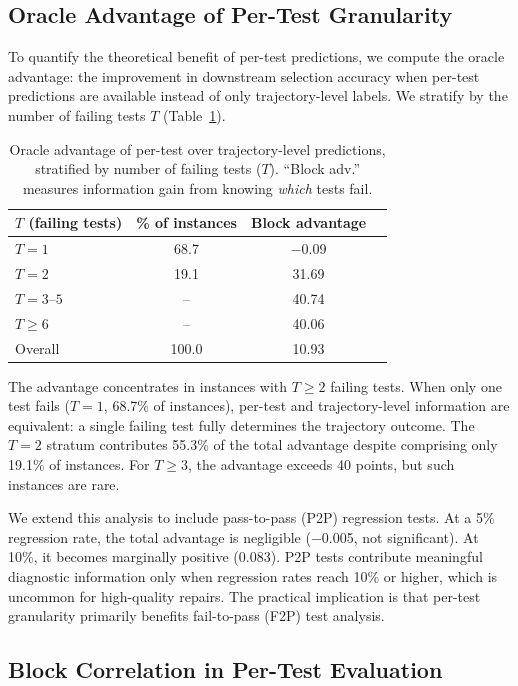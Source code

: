 \documentclass[11pt,a4paper]{article}
\begin{document}
\subsection{Oracle Advantage of Per-Test Granularity}
\label{sec:oracle}

To quantify the theoretical benefit of per-test predictions, we compute the oracle advantage: the improvement in downstream selection accuracy when per-test predictions are available instead of only trajectory-level labels. We stratify by the number of failing tests $T$ (Table~\ref{tab:oracle}).

\begin{table}[t]
\centering
\caption{Oracle advantage of per-test over trajectory-level predictions, stratified by number of failing tests ($T$). ``Block adv.'' measures information gain from knowing \emph{which} tests fail.}
\label{tab:oracle}
\small
\begin{tabular}{lccc}
\toprule
$T$ (failing tests) & \% of instances & Block advantage \\
\midrule
$T{=}1$ & 68.7 & $-$0.09 \\
$T{=}2$ & 19.1 & 31.69 \\
$T{=}3$--$5$ & -- & 40.74 \\
$T \geq 6$ & -- & 40.06 \\
\midrule
Overall & 100.0 & 10.93 \\
\bottomrule
\end{tabular}
\end{table}

The advantage concentrates in instances with $T \geq 2$ failing tests. When only one test fails ($T{=}1$, 68.7\% of instances), per-test and trajectory-level information are equivalent: a single failing test fully determines the trajectory outcome. The $T{=}2$ stratum contributes 55.3\% of the total advantage despite comprising only 19.1\% of instances. For $T \geq 3$, the advantage exceeds 40 points, but such instances are rare.

We extend this analysis to include pass-to-pass (P2P) regression tests. At a 5\% regression rate, the total advantage is negligible ($-$0.005, not significant). At 10\%, it becomes marginally positive (0.083). P2P tests contribute meaningful diagnostic information only when regression rates reach 10\% or higher, which is uncommon for high-quality repairs. The practical implication is that per-test granularity primarily benefits fail-to-pass (F2P) test analysis.

\subsection{Block Correlation in Per-Test Evaluation}
\label{sec:icc}
\end{document}
